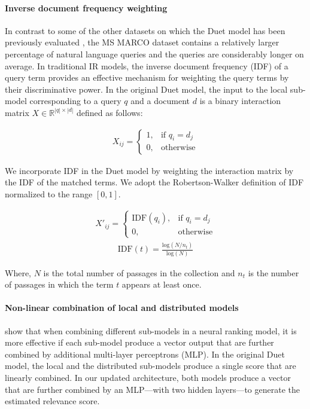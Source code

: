 \documentclass{article}
\begin{document}
\paragraph{Inverse document frequency weighting}
In contrast to some of the other datasets on which the Duet model has been previously evaluated \citep{mitra2016learning, nanni2017benchmark}, the MS MARCO dataset contains a relatively larger percentage of natural language queries and the queries are considerably longer on average.
In traditional IR models, the inverse document frequency (IDF) \citep{robertson2004understanding} of a query term provides an effective mechanism for weighting the query terms by their discriminative power.
In the original Duet model, the input to the local sub-model corresponding to a query $q$ and a document $d$ is a binary interaction matrix $X \in \mathbb{R}^{|q| \times |d|}$ defined as follows:

\begin{align}
    X_{ij} =
    \begin{cases}
        1, & \text{if } q_i = d_j\\
        0, & \text{otherwise}
    \end{cases}
\end{align}

We incorporate IDF in the Duet model by weighting the interaction matrix by the IDF of the matched terms.
We adopt the Robertson-Walker definition of IDF \citep{jones2000probabilistic} normalized to the range $[0, 1]$.

\begin{align}
    X'_{ij} =
    \begin{cases}
        \text{IDF}(q_i), & \text{if } q_i = d_j\\
        0, & \text{otherwise}
    \end{cases}
\end{align}
\begin{align}
    \text{IDF}(t) = \frac{\text{log}(N/n_t)}{\text{log}(N)}
\end{align}

Where, $N$ is the total number of passages in the collection and $n_t$ is the number of passages in which the term $t$ appears at least once.

\paragraph{Non-linear combination of local and distributed models}
\citet{zamani2018neural} show that when combining different sub-models in a neural ranking model, it is more effective if each sub-model produce a vector output that are further combined by additional multi-layer perceptrons (MLP).
In the original Duet model, the local and the distributed sub-models produce a single score that are linearly combined.
In our updated architecture, both models produce a vector that are further combined by an MLP---with two hidden layers---to generate the estimated relevance score.
\end{document}
